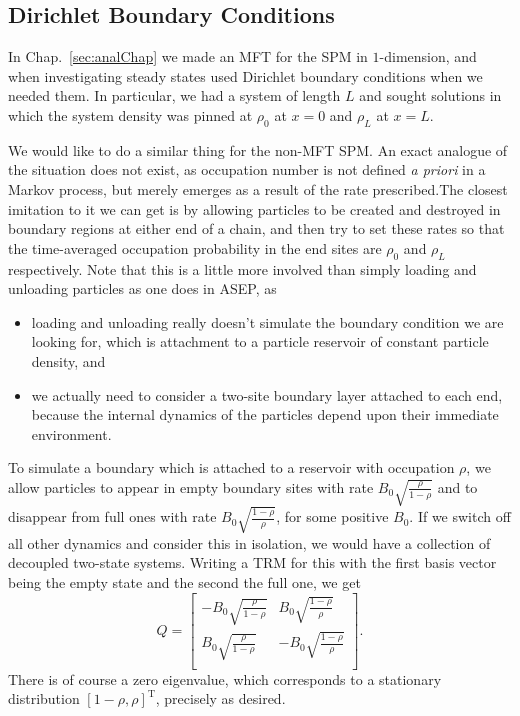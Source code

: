 \subsection{Dirichlet Boundary Conditions} \label{sec:CTMPBoundaries}
In Chap.~\ref{sec:analChap} we made an MFT for the SPM in $1$-dimension, and when 
investigating steady states used Dirichlet boundary conditions when we needed them.
In particular, we had a system of length $L$ and sought solutions in which the system
density was pinned at $\rho_0$ at $x=0$ and $\rho_L$ at $x=L$. 

We would like to do a similar thing for the non-MFT SPM. An exact analogue of the situation
does not exist, as occupation number is not defined \textit{a priori} in a Markov process, but merely emerges as a result of the rate prescribed.The closest imitation to it
we can get is by allowing particles to be created and destroyed in boundary regions at
either end of a chain, and then try to set these rates so that the time-averaged occupation probability in the end sites are $\rho_0$ and $\rho_L$ respectively. Note
that this is a little more involved than simply loading and unloading particles as
one does in ASEP, as
\begin{itemize}
 \item loading and unloading really doesn't simulate the boundary condition we are looking for,
 which is attachment to a particle reservoir of constant particle density, and
 \item we actually need to consider a two-site boundary layer attached to each end, because the internal dynamics of the particles depend upon their immediate environment.
\end{itemize}
To simulate a boundary which is attached to a reservoir with occupation $\rho$, we allow
particles to appear in empty boundary sites with rate $B_0 \sqrt{\frac{\rho}{1-\rho}}$
and to disappear from full ones with rate $B_0 \sqrt{\frac{1-\rho}{\rho}}$,
for some positive $B_0$. If we switch
off all other dynamics and consider this in isolation, we would have a collection of
decoupled two-state systems. Writing a TRM for this with the first basis vector being
the empty state and the second the full one, we get
\begin{equation} \label{eq:blinkRates}
 Q = 
 \begin{bmatrix}
  - B_0 \sqrt{\frac{\rho}{1-\rho}} & B_0 \sqrt{\frac{1-\rho}{\rho}} \\
  B_0 \sqrt{\frac{\rho}{1-\rho}} & -B_0 \sqrt{\frac{1-\rho}{\rho}} \\
 \end{bmatrix}.
\end{equation}
There is of course a zero eigenvalue, which corresponds to a stationary distribution
$ [1-\rho, \rho]^\mathrm{T} $, precisely as desired.

